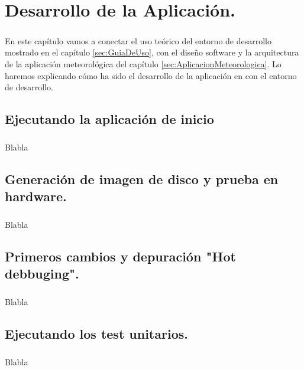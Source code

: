 \chapter{Desarrollo de la Aplicación.}\label{sec:Desarrollo}

\paragraph{}En este capítulo vamos a conectar el uso teórico del entorno de desarrollo
mostrado en el capítulo \ref{sec:GuiaDeUso}, con el diseño software y la arquitectura de
la aplicación meteorológica del capítulo \ref{sec:AplicacionMeteorologica}. Lo haremos
explicando cómo ha sido el desarrollo de la aplicación en con el entorno de desarrollo.

\section{Ejecutando la aplicación de inicio}

\paragraph{}Blabla

\section{Generación de imagen de disco y prueba en hardware.}

\paragraph{}Blabla

\section{Primeros cambios y depuración "Hot debbuging".}

\paragraph{}Blabla

\section{Ejecutando los test unitarios.}

\paragraph{}Blabla

